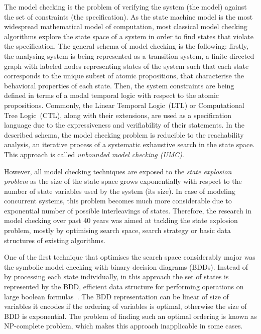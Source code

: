 The model checking is the problem of verifying the system (the model) against the set of constraints (the specification).
As the state machine model is the most widespread mathematical model of computation, most classical model checking algorithms explore the state space of a system in order to find states that violate the specification.
The general schema of model checking is the following: firstly, the analysing system is being represented as a transition system, a finite directed graph with labeled nodes representing states of the system such that each state corresponds to the unique subset of atomic propositions, that characterise the behavioral properties of each state.
Then, the system constraints are being defined in terms of a modal temporal logic with respect to the atomic propositions. Commonly, the Linear Temporal Logic~(LTL) or Computational Tree Logic~(CTL), along with their extensions, are used as a specification language due to the expressiveness and verifiability of their statements. 
In the described schema, the model checking problem is reducible to the reachability analysis, an iterative process of a systematic exhaustive search in the state space. This approach is called \textit{unbounded model checking (UMC)}.

However, all model checking techniques are exposed to the \textit{state explosion problem} as the size of the state space grows exponentially with respect to the number of state variables used by the system (its size). In case of modeling concurrent systems, this problem becomes much more considerable due to exponential number of possible interleavings of states.
Therefore, the research in model checking over past 40 years was aimed at tackling the state explosion problem, mostly by optimising search space, search strategy or basic data structures of existing algorithms.

One of the first technique that optimises the search space considerably major was the symbolic model checking with binary decision diagrams (BDDs). Instead of by processing each state individually, in this approach the set of states is represented by the BDD, efficient data structure for performing operations on large boolean formulas~\cite{clarke2012model}.
The BDD representation can be linear of size of variables it encodes if the ordering of variables is optimal, otherwise the size of BDD is exponential. The problem of finding such an optimal ordering is known as NP-complete problem, which makes this approach inapplicable in some cases.

